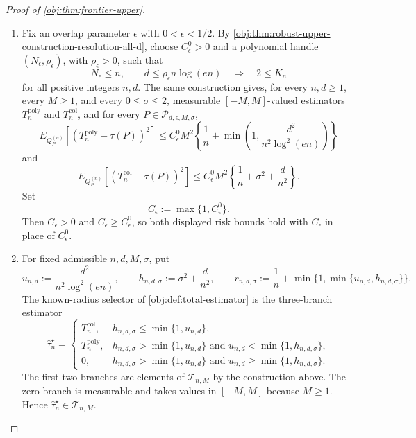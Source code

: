 \begin{proof}[Proof of \cref{obj:thm:frontier-upper}]
\begin{enumerate}
\item Fix an overlap parameter \(\epsilon\) with \(0<\epsilon<1/2\).  By
\cref{obj:thm:robust-upper-construction-resolution-all-d}, choose
\(C_{\epsilon}^{0}>0\) and a polynomial handle
\((N_{\epsilon},\rho_{\epsilon})\), with \(\rho_{\epsilon}>0\), such that
\[
N_{\epsilon}\le n,
\qquad
 d\le \rho_{\epsilon}n\log(en)
\quad\Longrightarrow\quad
2\le K_n
\]
for all positive integers \(n,d\).  The same construction gives, for every
\(n,d\ge1\), every \(M\ge1\), and every \(0\le\sigma\le2\), measurable
\([-M,M]\)-valued estimators \(T_n^{\mathrm{poly}}\) and
\(T_n^{\mathrm{col}}\), and for every
\(P\in\mathcal P_{d,\epsilon,M,\sigma}\),
\[
E_{Q_P^{(n)}}\!\left[
\left(T_n^{\mathrm{poly}}-\tau(P)\right)^2
\right]
\le
C_{\epsilon}^{0}M^2
\left\{
\frac1n+\min\left(1,\frac{d^2}{n^2\log^2(en)}\right)
\right\}
\]
and
\[
E_{Q_P^{(n)}}\!\left[
\left(T_n^{\mathrm{col}}-\tau(P)\right)^2
\right]
\le
C_{\epsilon}^{0}M^2
\left\{
\frac1n+\sigma^2+\frac{d}{n^2}
\right\}.
\]
Set
\[
C_{\epsilon}:=\max\{1,C_{\epsilon}^{0}\}.
\]
Then \(C_{\epsilon}>0\) and \(C_{\epsilon}\ge C_{\epsilon}^{0}\), so both
displayed risk bounds hold with \(C_{\epsilon}\) in place of
\(C_{\epsilon}^{0}\). %

\item For fixed admissible \(n,d,M,\sigma\), put
\[
u_{n,d}:=\frac{d^2}{n^2\log^2(en)},
\qquad
h_{n,d,\sigma}:=\sigma^2+\frac{d}{n^2},
\qquad
r_{n,d,\sigma}:=\frac1n+\min\{1,\min\{u_{n,d},h_{n,d,\sigma}\}\}.
\]
The known-radius selector of \cref{obj:def:total-estimator} is the three-branch
estimator
\[
\widehat\tau_n^{\star}
=
\begin{cases}
T_n^{\mathrm{col}},
& h_{n,d,\sigma}\le \min\{1,u_{n,d}\},\\
T_n^{\mathrm{poly}},
& h_{n,d,\sigma}> \min\{1,u_{n,d}\}
  \text{ and } u_{n,d}<\min\{1,h_{n,d,\sigma}\},\\
0,
& h_{n,d,\sigma}> \min\{1,u_{n,d}\}
  \text{ and } u_{n,d}\ge \min\{1,h_{n,d,\sigma}\}.
\end{cases}
\]
The first two branches are elements of \(\mathcal T_{n,M}\) by the construction
above.  The zero branch is measurable and takes values in \([-M,M]\) because
\(M\ge1\).  Hence \(\widehat\tau_n^{\star}\in\mathcal T_{n,M}\). %


\end{enumerate}
\end{proof}

